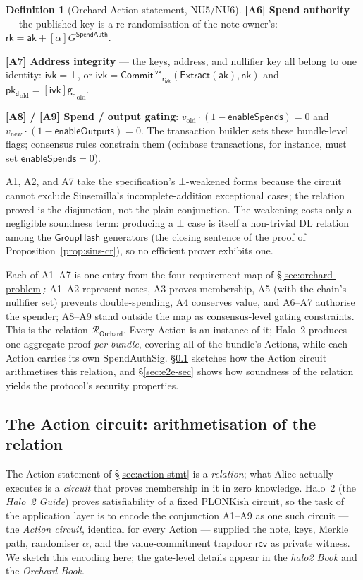 \documentclass[11pt,a4paper]{article}
\theoremstyle{definition}
\newtheorem{definition}[theorem]{Definition}
\newcommand{\Rel}{\mathcal{R}}
\newcommand{\rk}{\mathsf{rk}}
\newcommand{\CommitIvk}{\ensuremath{\mathsf{Commit}^{\mathsf{ivk}}}}
\newcommand{\Extract}{\ensuremath{\mathsf{Extract}}}
\newcommand{\GroupHash}{\ensuremath{\mathsf{GroupHash}}}
\newcommand{\aksym}{\ensuremath{\mathsf{ak}}}
\newcommand{\nksym}{\ensuremath{\mathsf{nk}}}
\newcommand{\ivk}{\ensuremath{\mathsf{ivk}}}
\newcommand{\pkd}{\ensuremath{\mathsf{pk_d}}}
\newcommand{\gd}{\ensuremath{\mathsf{g_d}}}
\newcommand{\rcv}{\ensuremath{\mathsf{rcv}}}
\newcommand{\rivk}{\ensuremath{\mathsf{r_{ivk}}}}
\begin{document}
\begin{definition}[Orchard Action statement, NU5/NU6]
\noindent
\textbf{[A6] Spend authority} --- the published key is a re-randomisation of
the note owner's: $\rk = \aksym + [\alpha] G^{\mathsf{SpendAuth}}$.

\noindent
\textbf{[A7] Address integrity} --- the keys, address, and nullifier key all
belong to one identity:
$\ivk = \bot$, or
$\ivk = \CommitIvk_{\rivk}(\Extract(\aksym), \nksym)$ and
$\pkd_{\mathrm{old}} = [\ivk] \gd_{\mathrm{old}}$.

\noindent
\textbf{[A8] / [A9] Spend / output gating}:
$v_{\mathrm{old}} \cdot (1 - \mathsf{enableSpends}) = 0$ and
$v_{\mathrm{new}} \cdot (1 - \mathsf{enableOutputs}) = 0$. The transaction
builder sets these bundle-level flags; consensus rules constrain them
(coinbase transactions, for instance, must set $\mathsf{enableSpends} = 0$).
\end{definition}

A1, A2, and A7 take the specification's $\bot$-weakened forms because the
circuit cannot exclude Sinsemilla's incomplete-addition exceptional cases;
the relation proved is the disjunction, not the plain conjunction. The
weakening costs only a negligible soundness term: producing a $\bot$ case
is itself a non-trivial DL relation among the $\GroupHash$ generators (the
closing sentence of the proof of Proposition~\ref{prop:sins-cr}), so no
efficient prover exhibits one.

Each of A1--A7 is one entry from the four-requirement map of
\S\ref{sec:orchard-problem}: A1--A2 represent notes, A3 proves membership,
A5 (with the chain's nullifier set) prevents double-spending, A4 conserves
value, and A6--A7 authorise the spender; A8--A9 stand outside the map as
consensus-level gating constraints. This is the relation
$\Rel_{\mathsf{Orchard}}$. Every Action is an instance of it; Halo~2
produces one aggregate proof \emph{per bundle}, covering all of the
bundle's Actions, while each Action carries its own SpendAuthSig.
\S\ref{sec:circuit} sketches how the Action circuit arithmetises this relation,
and \S\ref{sec:e2e-sec} shows how soundness of the relation yields the
protocol's security properties.
\subsection{The Action circuit: arithmetisation of the relation}\label{sec:circuit}

The Action statement of \S\ref{sec:action-stmt} is a \emph{relation}; what Alice
actually executes is a \emph{circuit} that proves membership in it in zero
knowledge. Halo~2 (the \emph{Halo~2 Guide}) proves satisfiability of a fixed
PLONKish circuit, so the task of the application layer is to encode the
conjunction A1--A9 as one such circuit --- the \emph{Action circuit}, identical
for every Action --- supplied the note, keys, Merkle path, randomiser $\alpha$, and the
value-commitment trapdoor $\rcv$ as private witness. We sketch this encoding here; the gate-level
details appear in the \emph{halo2 Book} and the \emph{Orchard Book}.
\end{document}
